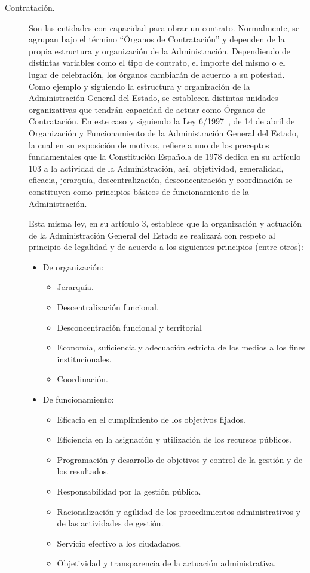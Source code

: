 \begin{description}
 \item [Contratación.] Son las entidades con capacidad para obrar un contrato. Normalmente,
se agrupan bajo el término ``Órganos de Contratación'' y dependen de la propia estructura y organización
de la Administración. Dependiendo de distintas variables como el tipo de contrato, el importe del 
mismo o el lugar de celebración, los órganos cambiarán de acuerdo a su potestad. Como ejemplo y siguiendo
la estructura y organización de la Administración General del Estado, se establecen distintas unidades
organizativas que tendrán capacidad de actuar como Órganos de Contratación. En este caso y siguiendo 
la Ley 6/1997~\cite{l6-1997}, de 14 de abril de Organización y Funcionamiento de la Administración 
General del Estado, la cual en su exposición de motivos, refiere a uno de los preceptos fundamentales
que la Constitución Española de 1978 dedica en su artículo 103 a la actividad de la Administración, así, objetividad,
generalidad, eficacia, jerarquía, descentralización, desconcentración y coordinación se constituyen como principios básicos 
de funcionamiento de la Administración.

Esta misma ley, en su artículo 3, establece que la organización y actuación de la Administración General del Estado se realizará 
con respeto al principio de legalidad y de acuerdo a los siguientes principios (entre otros):
\begin{itemize}
 \item De organización:
\begin{itemize}
 \item Jerarquía.
 \item Descentralización funcional.
 \item Desconcentración funcional y territorial
 \item Economía, suficiencia y adecuación estricta de los medios a los fines institucionales.
 \item Coordinación.
\end{itemize}
 \item De funcionamiento: 
\begin{itemize}
\item Eficacia en el cumplimiento de los objetivos fijados.
\item Eficiencia en la asignación y utilización de los recursos públicos.
\item Programación y desarrollo de objetivos y control de la gestión y de los resultados.
\item Responsabilidad por la gestión pública.
\item Racionalización y agilidad de los procedimientos administrativos y de las actividades de gestión.
\item Servicio efectivo a los ciudadanos.
\item Objetividad y transparencia de la actuación administrativa.
\end{itemize}
\end{itemize} 


\end{description}
